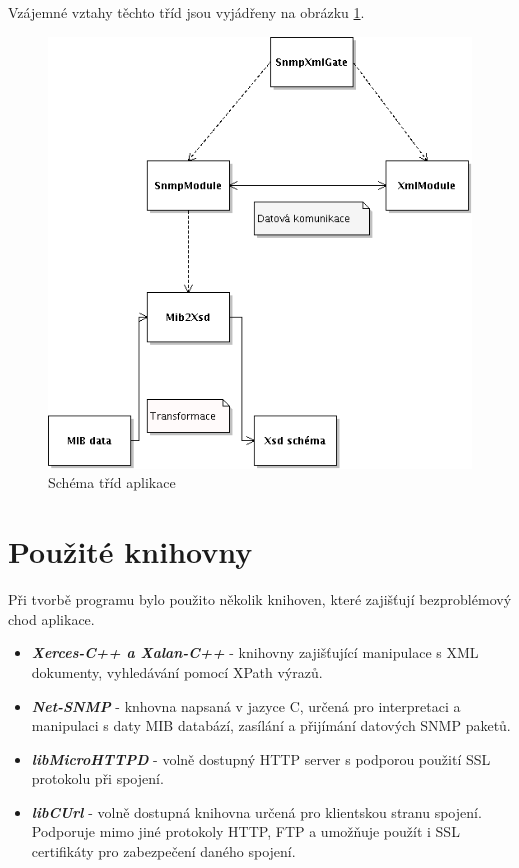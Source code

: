Vzájemné vztahy těchto tříd jsou vyjádřeny na obrázku \ref{obr_impl_vztahy_trid}.

\begin{figure}[htp]
	\begin{center}
		\includegraphics[width=12cm]{obrazky/05_schema_trid.png}
		\caption{Schéma tříd aplikace}
		\label{obr_impl_vztahy_trid}
	\end{center}
\end{figure}


\section{Použité knihovny}
Při tvorbě programu bylo použito několik knihoven, které zajišťují bezproblémový chod aplikace.

\begin{itemize}
	\item \textbf{ \textit{Xerces-C++ a Xalan-C++} } - knihovny zajišťující manipulace s XML dokumenty, vyhledávání pomocí XPath výrazů.
	\item \textbf{ \textit{Net-SNMP} } - knhovna napsaná v jazyce C, určená pro interpretaci a manipulaci s daty MIB databází, zasílání a 
	přijímání datových SNMP paketů.
	\item \textbf{ \textit{libMicroHTTPD} } - volně dostupný HTTP server s podporou použití SSL protokolu při spojení.
	\item \textbf{ \textit{libCUrl} } - volně dostupná knihovna určená pro klientskou stranu spojení. Podporuje mimo jiné protokoly HTTP, FTP a
	umožňuje použít i SSL certifikáty pro zabezpečení daného spojení.
\end{itemize}

